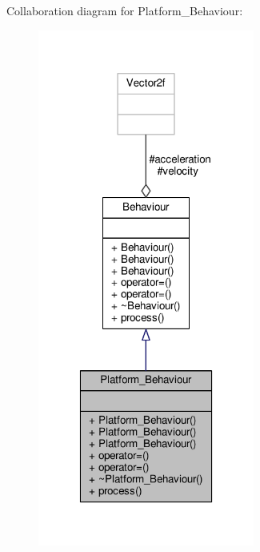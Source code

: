 Collaboration diagram for Platform\+\_\+\+Behaviour\+:\nopagebreak
\begin{figure}[H]
\begin{center}
\leavevmode
\includegraphics[width=202pt]{classPlatform__Behaviour__coll__graph}
\end{center}
\end{figure}
